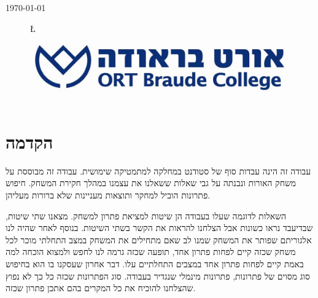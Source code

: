\documentclass[12pt,twoside]{article}
\begin{document}
\begin{titlepage}
{\large \today} \\[2cm] %
\begin{figure}
	\begin{center}
		\L{\includegraphics[scale=0.3]{images/Braude_Logo.jpg}}
	\end{center}
\end{figure}


\vfill %

\end{titlepage}
\tableofcontents

\newpage
\section{הקדמה}
עבודה זה הינה עבדות סוף של סטודנט במחלקה למתמטיקה שימושית.
עבודה זה 
מבוססת על משחק האורות 
ונבנתה 
על  גבי שאלות ששאלנו את עצמנו במהלך חקירת המשחק.
חיפוש פתרונות הוביל למחקר ותוצאות מעניינות 
שלא ברורות מעליהן.

השאלות לדוגמה שעלו בעבודה הן שיטות למציאת פתרון למשחק.
מצאנו שתי שיטות, שבדיעבד נראו כשונות אבל הצלחנו להראות את הקשר בשתי השיטות.
בנוסף 
לאחר שהיה לנו אלגוריתם שפותר את המשחק שמנו לב שאם מתחילים את המשחק 
במצב התחלתי מוכר לכל משחק שכזה קיים לפחות פתרון אחד,
תופעה שכזה גרמה לנו לחפש ולמצוא הוכחה למה באמת קיים לפחות פתרון אחד במצבים התחלתיים עלו.
דבר אחרון שעסקנו בו הוא בחיפוש סוג מסוים של פתרונות, פתרונות מינמלי שנגדיר בעבודה. 
סוג הפתרונות שכזה כל כך לא נפוץ שהצלחנו להוכיח את כל המקרים 
בהם אתכן פתרון שכזה.
\end{document}
